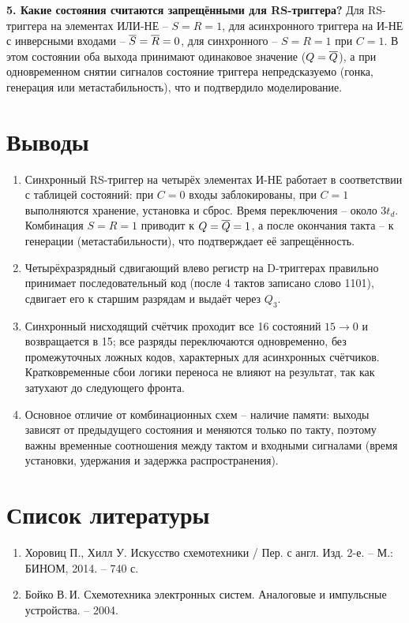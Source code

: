 \documentclass[14pt]{extarticle}
\begin{document}
\textbf{5. Какие состояния считаются запрещёнными для RS-триггера?}
Для RS-триггера на элементах ИЛИ-НЕ -- $S=R=1$, для асинхронного триггера на И-НЕ с
инверсными входами -- $\overline{S}=\overline{R}=0$, для синхронного -- $S=R=1$ при $C=1$. В этом
состоянии оба выхода принимают одинаковое значение ($Q=\overline{Q}$), а при одновременном снятии
сигналов состояние триггера непредсказуемо (гонка, генерация или метастабильность), что
и подтвердило моделирование.

\section*{Выводы}
\begin{enumerate}[leftmargin=*, label=\arabic*.]
\item Синхронный RS-триггер на четырёх элементах И-НЕ работает в соответствии с таблицей
состояний: при $C=0$ входы заблокированы, при $C=1$ выполняются хранение, установка и
сброс. Время переключения -- около $3t_d$. Комбинация $S=R=1$ приводит к $Q=\overline{Q}=1$, а
после окончания такта -- к генерации (метастабильности), что подтверждает её запрещённость.
\item Четырёхразрядный сдвигающий влево регистр на D-триггерах правильно принимает
последовательный код (после 4 тактов записано слово 1101), сдвигает его к старшим разрядам
и выдаёт через $Q_3$.
\item Синхронный нисходящий счётчик проходит все 16 состояний $15\to0$ и возвращается в 15;
все разряды переключаются одновременно, без промежуточных ложных кодов, характерных для
асинхронных счётчиков. Кратковременные сбои логики переноса не влияют на результат, так как
затухают до следующего фронта.
\item Основное отличие от комбинационных схем -- наличие памяти: выходы зависят от
предыдущего состояния и меняются только по такту, поэтому важны временные соотношения между
тактом и входными сигналами (время установки, удержания и задержка распространения).
\end{enumerate}

\section*{Список литературы}
\begin{enumerate}[leftmargin=*, label=\arabic*.]
\item Хоровиц П., Хилл У. Искусство схемотехники / Пер. с англ. Изд. 2-е. -- М.: БИНОМ, 2014. -- 740 с.
\item Бойко В.\,И. Схемотехника электронных систем. Аналоговые и импульсные устройства. -- 2004.
\end{enumerate}
\end{document}
